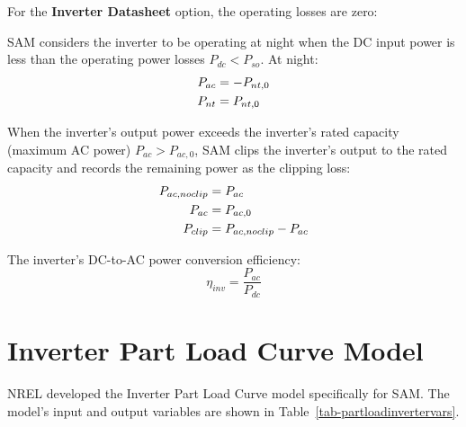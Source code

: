\documentclass[12pt,letterpaper]{article}
\begin{document}
For the \textbf{Inverter Datasheet} option, the operating losses are zero:

SAM considers the inverter to be operating at night when the DC input power is less than the operating power losses $P_{dc} < P_{so}$. At night:
\begin{align}
P_{ac} &= -P_{nt,0} \notag\\
P_{nt} &= P_{nt,0}
\end{align}

When the inverter's output power exceeds the inverter's rated capacity (maximum AC power) $P_{ac} > P_{ac,0}$, SAM clips the inverter's output to the rated capacity and records the remaining power as the clipping loss:
\begin{align}
P_{ac,noclip} &= P_{ac} \notag\\
P_{ac} &= P_{ac,0} \notag\\
P_{clip} &= P_{ac,noclip} - P_{ac}
\end{align}

The inverter's DC-to-AC power conversion efficiency:
\begin{equation}
\eta_{inv} = \frac{P_{ac}}{P_{dc}}
\end{equation}

\section{Inverter Part Load Curve Model}\label{sec-partloadinverter}

NREL developed the Inverter Part Load Curve model specifically for SAM. The model's input and output variables are shown in Table~\ref{tab-partloadinvertervars}.
\end{document}
